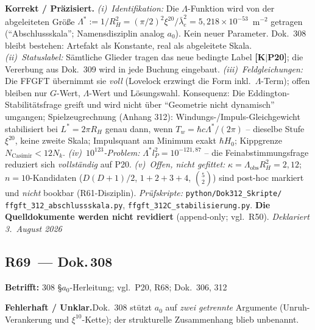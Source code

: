 \smallskip\noindent\textbf{Korrekt / Präzisiert.}\quad
\emph{(i)~Identifikation:} Die $\Lambda$-Funktion wird von der
abgeleiteten Größe $\Lambda^{*} := 1/R_H^2 = (\pi/2)^2\xi^{20}/
\bar\lambda_e^2 = 5{,}218\times10^{-53}$~m$^{-2}$ getragen
(\enquote{Abschlussskala}; Namensdisziplin analog $a_0$). Kein neuer
Parameter. Dok.~308 bleibt bestehen: Artefakt als Konstante, real als
abgeleitete Skala. \emph{(ii)~Statuslabel:} Sämtliche Glieder tragen
das neue bedingte Label \textbf{[K$|$P20]}; die Vererbung aus Dok.~309
wird in jede Buchung eingebaut. \emph{(iii)~Feldgleichungen:} Die FFGFT
übernimmt sie \emph{voll} (Lovelock erzwingt die Form inkl.\
$\Lambda$-Term); offen bleiben nur $G$-Wert, $\Lambda$-Wert und
Lösungswahl. Konsequenz: Die Eddington-Stabilitätsfrage greift und wird
nicht über \enquote{Geometrie nicht dynamisch} umgangen; Spielzeug\-rechnung
(Anhang 312): Windungs-/Impuls-Gleichgewicht stabilisiert bei
$L^{*}=2\pi R_H$ genau dann, wenn $T_w = \hbar c\Lambda^{*}/(2\pi)$ --
dieselbe Stufe $\xi^{20}$, keine zweite Skala; Impulsquant am Minimum
exakt $\hbar H_0$; Kippgrenze $N_\text{Casimir} < 12N_k$.
\emph{(iv)~$10^{123}$-Problem:} $\Lambda^{*}l_P^2 = 10^{-121{,}87}$ --
die Feinabstimmungsfrage reduziert sich \emph{vollständig} auf P20.
\emph{(v)~Offen, nicht gefittet:} $\kappa = \Lambda_\text{obs}R_H^2
= 2{,}12$; $n{=}10$-Kandidaten ($D(D{+}1)/2$, $1{+}2{+}3{+}4$,
$\binom{5}{2}$) sind post-hoc markiert und \emph{nicht} bookbar
(R61-Disziplin). \emph{Prüfskripte:} \texttt{python/Dok312\_Skripte/}
\texttt{ffgft\_312\_abschlussskala.py}, \texttt{ffgft\_312C\_stabilisierung.py}.
\textbf{Die Quelldokumente werden nicht revidiert} (append-only; vgl.\ R50).
\emph{Deklariert 3.~August 2026}

\medskip

\subsection*{R69~--- Dok.\,308}

\noindent\textbf{Betrifft:} 308 \S{}$a_0$-Herleitung; vgl.\ P20, R68;
Dok.~306, 312

\smallskip\noindent\textbf{Fehlerhaft / Unklar.}\quad Dok.~308 stützt
$a_0$ auf \emph{zwei getrennte} Argumente (Unruh-Verankerung und
$\xi^{10}$-Kette); der strukturelle Zusammenhang blieb unbenannt.

